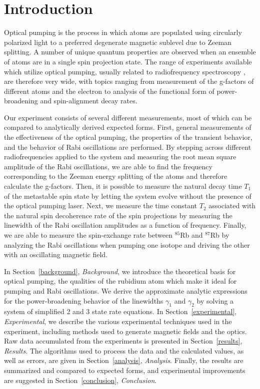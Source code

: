 
\section{Introduction}\label{introduction}

Optical pumping is the process in which atoms are populated using circularly polarized light to a preferred degenerate magnetic sublevel due to Zeeman splitting. A number of unique quantum properties are observed when an ensemble of atoms are in a single spin projection state. The range of experiments available which utilize optical pumping, usually related to radiofrequency spectroscopy \cite{bloom}, are therefore very wide, with topics ranging from measurement of the g-factors of different atoms and the electron to analysis of the functional form of power-broadening and spin-alignment decay rates.

Our experiment consists of several different measurements, most of which can be compared to analytically derived expected forms. First, general measurements of the effectiveness of the optical pumping, the properties of the transient behavior, and the behavior of Rabi oscillations are performed. By stepping across different radiofrequencies applied to the system and measuring the root mean square amplitude of the Rabi oscillations, we are able to find the frequency corresponding to the Zeeman energy splitting of the atoms and therefore calculate the g-factors. Then, it is possible to measure the natural decay time $T_{1}$ of the metastable spin state by letting the system evolve without the presence of the optical pumping laser. Next, we measure the time constant $T_{2}$ associated with the natural spin decoherence rate of the spin projections by measuring the linewidth of the Rabi oscillation amplitudes as a function of frequency. Finally, we are able to measure the spin-exchange rate between $^{85}$Rb and $^{87}$Rb by analyzing the Rabi oscillations when pumping one isotope and driving the other with an oscillating magnetic field.

In Section~\ref{background}, \emph{Background}, we introduce the theoretical basis for optical pumping, the qualities of the rubidium atom which make it ideal for pumping and Rabi oscillations. We derive the approximate analytic expressions for the power-broadening behavior of the linewidths $\gamma_{1}$ and $\gamma_{2}$ by solving a system of simplified 2 and 3 state rate equations. In Section~\ref{experimental}, \emph{Experimental}, we describe the various experimental techniques used in the experiment, including methods used to generate magnetic fields and the optics. Raw data accumulated from the experiments is presented in Section~\ref{results}, \emph{Results}. The algorithms used to process the data and the calculated values, as well as errors, are given in Section~\ref{analysis}, \emph{Analysis}. Finally, the results are summarized and compared to expected forms, and experimental improvements are suggested in Section~\ref{conclusion}, \emph{Conclusion}.